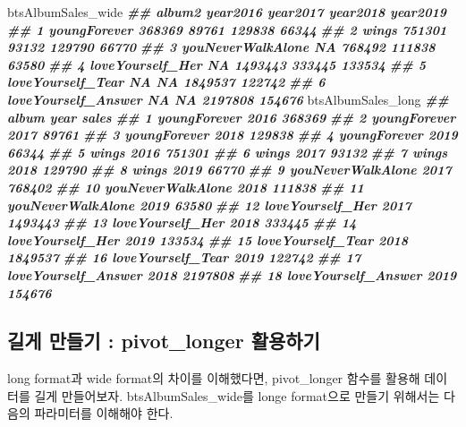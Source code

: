 \documentclass[
]{book}
\newenvironment{Shaded}{\begin{snugshade}}{\end{snugshade}}
\newcommand{\DocumentationTok}[1]{\textcolor[rgb]{0.56,0.35,0.01}{\textbf{\textit{#1}}}}
\newcommand{\NormalTok}[1]{#1}
\theoremstyle{definition}
\theoremstyle{definition}
\theoremstyle{definition}
\theoremstyle{definition}
\theoremstyle{remark}
\begin{document}
\begin{Shaded}
\begin{Highlighting}[]
\NormalTok{btsAlbumSales\_wide}
\DocumentationTok{\#\#                album2 year2016 year2017 year2018 year2019}
\DocumentationTok{\#\# 1        youngForever   368369    89761   129838    66344}
\DocumentationTok{\#\# 2               wings   751301    93132   129790    66770}
\DocumentationTok{\#\# 3   youNeverWalkAlone       NA   768492   111838    63580}
\DocumentationTok{\#\# 4    loveYourself\_Her       NA  1493443   333445   133534}
\DocumentationTok{\#\# 5   loveYourself\_Tear       NA       NA  1849537   122742}
\DocumentationTok{\#\# 6 loveYourself\_Answer       NA       NA  2197808   154676}
\NormalTok{btsAlbumSales\_long}
\DocumentationTok{\#\#                  album year   sales}
\DocumentationTok{\#\# 1         youngForever 2016  368369}
\DocumentationTok{\#\# 2         youngForever 2017   89761}
\DocumentationTok{\#\# 3         youngForever 2018  129838}
\DocumentationTok{\#\# 4         youngForever 2019   66344}
\DocumentationTok{\#\# 5                wings 2016  751301}
\DocumentationTok{\#\# 6                wings 2017   93132}
\DocumentationTok{\#\# 7                wings 2018  129790}
\DocumentationTok{\#\# 8                wings 2019   66770}
\DocumentationTok{\#\# 9    youNeverWalkAlone 2017  768402}
\DocumentationTok{\#\# 10   youNeverWalkAlone 2018  111838}
\DocumentationTok{\#\# 11   youNeverWalkAlone 2019   63580}
\DocumentationTok{\#\# 12    loveYourself\_Her 2017 1493443}
\DocumentationTok{\#\# 13    loveYourself\_Her 2018  333445}
\DocumentationTok{\#\# 14    loveYourself\_Her 2019  133534}
\DocumentationTok{\#\# 15   loveYourself\_Tear 2018 1849537}
\DocumentationTok{\#\# 16   loveYourself\_Tear 2019  122742}
\DocumentationTok{\#\# 17 loveYourself\_Answer 2018 2197808}
\DocumentationTok{\#\# 18 loveYourself\_Answer 2019  154676}
\end{Highlighting}
\end{Shaded}

\hypertarget{uxae38uxac8c-uxb9ccuxb4e4uxae30-pivot_longer-uxd65cuxc6a9uxd558uxae30}{%
\subsection{길게 만들기 : pivot\_longer 활용하기}\label{uxae38uxac8c-uxb9ccuxb4e4uxae30-pivot_longer-uxd65cuxc6a9uxd558uxae30}}

long format과 wide format의 차이를 이해했다면, pivot\_longer 함수를 활용해 데이터를 길게 만들어보자. btsAlbumSales\_wide를 longe format으로 만들기 위해서는 다음의 파라미터를 이해해야 한다.
\end{document}
